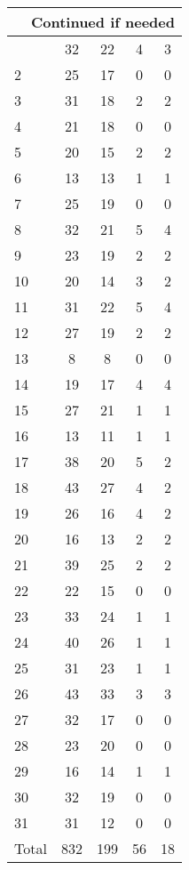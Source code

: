 \begin{center}
\begin{longtable}{l|c|c|c|c}
\hline \multicolumn{5}{|r|}{{Continued if needed}} \\ \hline
\endfoot 
1 & 32 & 22 & 4 & 3\\ \hline
2 & 25 & 17 & 0 & 0\\ \hline
3 & 31 & 18 & 2 & 2\\ \hline
4 & 21 & 18 & 0 & 0\\ \hline
5 & 20 & 15 & 2 & 2\\ \hline
6 & 13 & 13 & 1 & 1\\ \hline
7 & 25 & 19 & 0 & 0\\ \hline
8 & 32 & 21 & 5 & 4\\ \hline
9 & 23 & 19 & 2 & 2\\ \hline
10 & 20 & 14 & 3 & 2\\ \hline
11 & 31 & 22 & 5 & 4\\ \hline
12 & 27 & 19 & 2 & 2\\ \hline
13 & 8 & 8 & 0 & 0\\ \hline
14 & 19 & 17 & 4 & 4\\ \hline
15 & 27 & 21 & 1 & 1\\ \hline
16 & 13 & 11 & 1 & 1\\ \hline
17 & 38 & 20 & 5 & 2\\ \hline
18 & 43 & 27 & 4 & 2\\ \hline
19 & 26 & 16 & 4 & 2\\ \hline
20 & 16 & 13 & 2 & 2\\ \hline
21 & 39 & 25 & 2 & 2\\ \hline
22 & 22 & 15 & 0 & 0\\ \hline
23 & 33 & 24 & 1 & 1\\ \hline
24 & 40 & 26 & 1 & 1\\ \hline
25 & 31 & 23 & 1 & 1\\ \hline
26 & 43 & 33 & 3 & 3\\ \hline
27 & 32 & 17 & 0 & 0\\ \hline
28 & 23 & 20 & 0 & 0\\ \hline
29 & 16 & 14 & 1 & 1\\ \hline
30 & 32 & 19 & 0 & 0\\ \hline
31 & 31 & 12 & 0 & 0\\ \hline
\hline \hline
Total & 832 & 199 & 56 & 18



\end{longtable}
\end{center}

 

